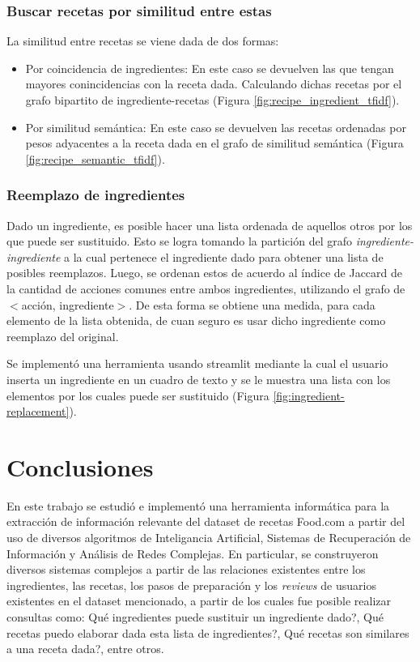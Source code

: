 \documentclass[
	a4paper, %
	10pt, %
	unnumberedsections, %
	twoside, %
]{LTJournalArticle}
\begin{document}
\subsubsection{Buscar recetas por similitud entre estas}

La similitud entre recetas se viene dada de dos formas:

\begin{itemize}
	\item Por coincidencia de ingredientes: En este caso se devuelven las que tengan mayores conincidencias
	con la receta dada. Calculando dichas recetas por el grafo bipartito de ingrediente-recetas (Figura \ref{fig:recipe_ingredient_tfidf}). 
	\item Por similitud semántica: En este caso se devuelven las recetas ordenadas por pesos adyacentes
	a la receta dada en el grafo de similitud semántica (Figura \ref{fig:recipe_semantic_tfidf}).
\end{itemize}

\subsubsection{Reemplazo de ingredientes}

Dado un ingrediente, es posible hacer una lista ordenada de aquellos otros por los que puede ser sustituido. 
Esto se logra tomando la partición del grafo \emph{ingrediente-ingrediente} a la cual pertenece el ingrediente 
dado para obtener una lista de posibles reemplazos. Luego, se ordenan estos de acuerdo al índice de Jaccard de 
la cantidad de acciones comunes entre ambos ingredientes, utilizando el grafo de $<$acción, ingrediente$>$. De 
esta forma se obtiene una medida, para cada elemento de la lista obtenida, de cuan seguro es usar dicho 
ingrediente como reemplazo del original. 

Se implementó una herramienta usando streamlit mediante la cual el usuario inserta un ingrediente en un cuadro 
de texto y se le muestra una lista con los elementos por los cuales puede ser sustituido 
(Figura \ref{fig:ingredient-replacement}).

\section{Conclusiones}

En este trabajo se estudió e implementó una herramienta informática para la extracción de información relevante 
del dataset de recetas Food.com a partir del uso de diversos algoritmos de Inteligancia Artificial, Sistemas de 
Recuperación de Información y Análisis de Redes Complejas. En particular, se construyeron diversos sistemas 
complejos a partir de las relaciones existentes entre los ingredientes, las recetas, los pasos de preparación y 
los \textit{reviews} de usuarios existentes en el dataset mencionado, a partir de los cuales fue posible realizar 
consultas como: Qué ingredientes puede sustituir un ingrediente dado?, Qué recetas puedo elaborar dada esta lista 
de ingredientes?, Qué recetas son similares a una receta dada?, entre otros.
\end{document}
